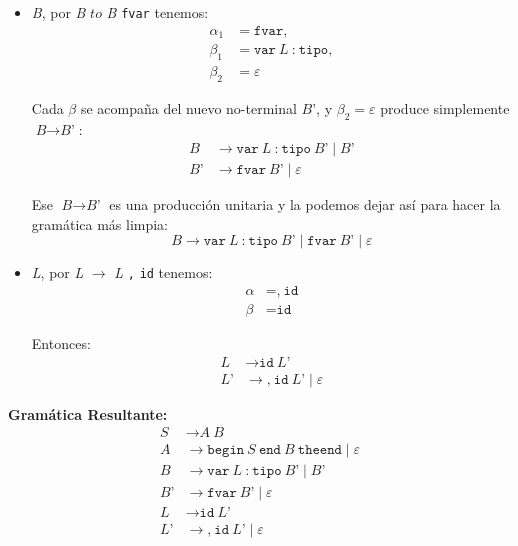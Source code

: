 \documentclass[12pt,letterpaper]{article}
\newcommand{\nt}[1]{\textit{#1}}
\newcommand{\tk}[1]{\texttt{#1}}
\newcommand{\eps}{\varepsilon}
\begin{document}
\begin{enumerate}[label=\arabic*.]
\begin{itemize}
\begin{itemize}[leftmargin=*]
    \item \nt{B}, por \nt{B} $to$ \nt{B} \tk{fvar} tenemos:
      \[
      \begin{aligned}
        \alpha_1 &= \tk{fvar},\\
        \beta_1 &= \tk{var}\ \nt{L}\ \tk{:}\ \tk{tipo},\\
        \beta_2 &= \eps
      \end{aligned}
      \]

      Cada $\beta$ se acompaña del nuevo no-terminal $\nt{B'}$, y $\beta_2 = \eps$ produce simplemente
      $\nt{B} \to \nt{B'}$:
      \[
      \begin{aligned}
        \nt{B}  &\to \tk{var}\ \nt{L}\ \tk{:}\ \tk{tipo}\ \nt{B'} \mid \nt{B'} \\
        \nt{B'} &\to \tk{fvar}\ \nt{B'} \mid \eps
      \end{aligned}
      \]
      
      Ese $\nt{B} \to \nt{B'}$ es una producción unitaria y la podemos dejar así para hacer la gramática más
      limpia:
      \[
      \nt{B} \to \tk{var}\ \nt{L}\ \tk{:}\ \tk{tipo}\ \nt{B'} \mid \tk{fvar}\ \nt{B'} \mid \eps
      \]
  
    \item \nt{L}, por \nt{L} $\to$ \nt{L} \tk{,} \tk{id} tenemos:
      \[
      \begin{aligned}
        \alpha &= \tk{,}\ \tk{id}\\
        \beta &= \tk{id}
      \end{aligned}
      \]

      Entonces:
      \[
      \begin{aligned}
        \nt{L}  &\to \tk{id}\ \nt{L'} \\
        \nt{L'} &\to \tk{,}\ \tk{id}\ \nt{L'} \mid \eps
      \end{aligned}
      \]
    \end{itemize}
    
    \textbf{Gramática Resultante:}
    \[
    \begin{aligned}
      \nt{S}  &\to \nt{A}\ \nt{B} \\
      \nt{A}  &\to \tk{begin}\ \nt{S}\ \tk{end}\ \nt{B}\ \tk{theend} \mid \eps \\
      \nt{B}  &\to \tk{var}\ \nt{L}\ \tk{:}\ \tk{tipo}\ \nt{B'} \mid \nt{B'} \\
      \nt{B'} &\to \tk{fvar}\ \nt{B'} \mid \eps \\
      \nt{L}  &\to \tk{id}\ \nt{L'} \\
      \nt{L'} &\to \tk{,}\ \tk{id}\ \nt{L'} \mid \eps
    \end{aligned}
    \]


\end{itemize}
\end{enumerate}
\end{document}
